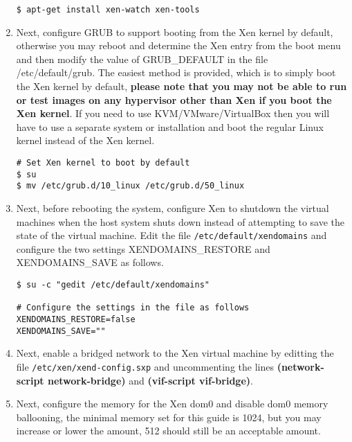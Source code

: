 \begin{enumerate}
\lstset{language=bash,caption=Installing Xen Tools}
\begin{lstlisting}
$ apt-get install xen-watch xen-tools
\end{lstlisting}

\item 	Next, configure GRUB to support booting from the Xen kernel by default, otherwise you may reboot and determine
			the Xen entry from the boot menu and then modify the value of GRUB\_DEFAULT in the file /etc/default/grub. The
			easiest method is provided, which is to simply boot the Xen kernel by default, {\bf please note that you may not be
			able to run or test \cernvm images on any hypervisor other than Xen if you boot the Xen kernel}. If you need to use
			KVM/VMware/VirtualBox then you will have to use a separate system or installation and boot the regular Linux
			kernel instead of the Xen kernel.
			
\lstset{language=bash,caption=Configure Booting the Xen Kernel}
\begin{lstlisting}
# Set Xen kernel to boot by default
$ su
$ mv /etc/grub.d/10_linux /etc/grub.d/50_linux
\end{lstlisting}

\item	Next, before rebooting the system, configure Xen to shutdown the virtual machines when the host system 
			shuts down instead of attempting to save the state of the virtual machine. Edit the file \verb|/etc/default/xendomains|
			and configure the two settings XENDOMAINS\_RESTORE and XENDOMAINS\_SAVE as follows.

\lstset{language=bash,caption=Configure Xen Virtual Machine Shutdown}
\begin{lstlisting}
$ su -c "gedit /etc/default/xendomains"

# Configure the settings in the file as follows
XENDOMAINS_RESTORE=false
XENDOMAINS_SAVE=""
\end{lstlisting}

\item	Next, enable a bridged network to the Xen virtual machine by editting the file \verb|/etc/xen/xend-config.sxp| and
			uncommenting the lines {\bf (network-script network-bridge)} and {\bf (vif-script vif-bridge)}.
	
\item	Next, configure the memory for the Xen dom0 and disable dom0 memory ballooning, the minimal memory 
			set for this guide is 1024, but you may increase or lower the amount, 512 should still be an acceptable amount.
			

\end{enumerate}
